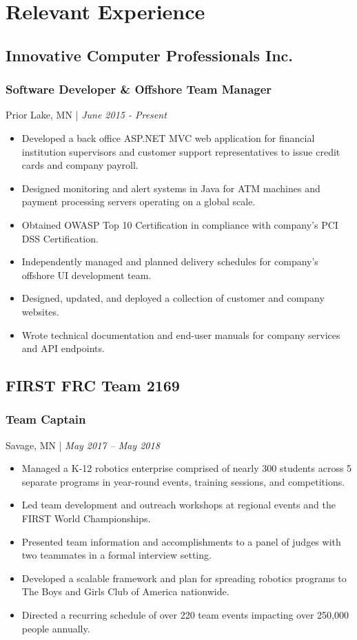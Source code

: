 \documentclass{article}
\begin{document}
\section{Relevant Experience}
\subsection{Innovative Computer Professionals Inc.}
\subsubsection{Software Developer \& Offshore Team Manager}
Prior Lake, MN | \textit{June 2015 - Present}
\begin{itemize}[leftmargin=*]
\item Developed a back office ASP.NET MVC web application for financial institution supervisors and customer support representatives to issue credit cards and company payroll.
\item Designed monitoring and alert systems in Java for ATM machines and payment processing servers operating on a global scale.
\item Obtained OWASP Top 10 Certification in compliance with company’s PCI DSS Certification.
\item Independently managed and planned delivery schedules for company’s offshore UI development team.
\item Designed, updated, and deployed a collection of customer and company websites.
\item Wrote technical documentation and end-user manuals for company services and API endpoints.
\end{itemize}
\subsection{FIRST FRC Team 2169}
\subsubsection{Team Captain}
Savage, MN | \textit{May 2017 – May 2018}
\begin{itemize}[leftmargin=*]
\item Managed a K-12 robotics enterprise comprised of nearly 300 students across 5 separate programs in year-round events, training sessions, and competitions.
\item Led team development and outreach workshops at regional events and the FIRST World Championships.
\item Presented team information and accomplishments to a panel of judges with two teammates in a formal interview setting.
\item Developed a scalable framework and plan for spreading robotics programs to The Boys and Girls Club of America nationwide.
\item Directed a recurring schedule of over 220 team events impacting over 250,000 people annually.    
\end{itemize}
\end{document}
